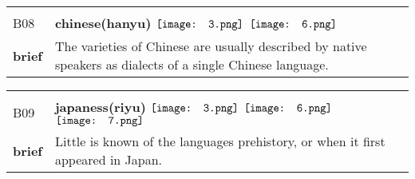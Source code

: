 \documentclass[UTF8]{article}
\begin{document}
            \begin{tabularx}{\textwidth}{p{1.5cm}X}
            \arrayrulecolor{myBlue}
        	\hline\\
            \small{B08}&
            \large{\bfseries{chinese(hanyu)}}\hfill
                                                            \phantom{$\vcenter{\hbox{\texttt{[image: 1.png]}}}$}
                                                                \phantom{$\vcenter{\hbox{\texttt{[image: 2.png]}}}$}
                                                                $\vcenter{\hbox{\texttt{[image: 3.png]}}}$
                                                                \phantom{$\vcenter{\hbox{\texttt{[image: 4.png]}}}$}
                                                                \phantom{$\vcenter{\hbox{\texttt{[image: 5.png]}}}$}
                                                                $\vcenter{\hbox{\texttt{[image: 6.png]}}}$
                                                                \phantom{$\vcenter{\hbox{\texttt{[image: 7.png]}}}$}
                                        \\[10pt]
            \large{\bfseries{brief}}&\noindent\parbox[c]{\hsize}{The varieties of Chinese are usually described by native speakers as dialects of a single Chinese language.} \\[5pt]
            \hline\\[-10pt]
        \end{tabularx}
            \begin{tabularx}{\textwidth}{p{1.5cm}X}
            \arrayrulecolor{myBlue}
        	\hline\\
            \small{B09}&
            \large{\bfseries{japaness(riyu)}}\hfill
                                                            \phantom{$\vcenter{\hbox{\texttt{[image: 1.png]}}}$}
                                                                \phantom{$\vcenter{\hbox{\texttt{[image: 2.png]}}}$}
                                                                $\vcenter{\hbox{\texttt{[image: 3.png]}}}$
                                                                \phantom{$\vcenter{\hbox{\texttt{[image: 4.png]}}}$}
                                                                \phantom{$\vcenter{\hbox{\texttt{[image: 5.png]}}}$}
                                                                $\vcenter{\hbox{\texttt{[image: 6.png]}}}$
                                                                $\vcenter{\hbox{\texttt{[image: 7.png]}}}$
                                        \\[10pt]
            \large{\bfseries{brief}}&\noindent\parbox[c]{\hsize}{Little is known of the languages prehistory, or when it first appeared in Japan. } \\[5pt]
            \hline\\[-10pt]
        \end{tabularx}
\end{document}
